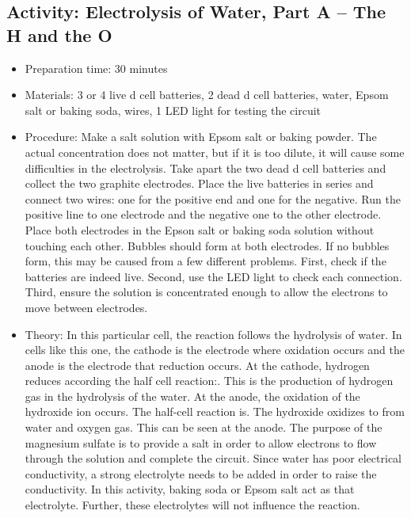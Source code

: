 \begin{itemize}
{\begin{itemize}
\subsection{Activity: Electrolysis of Water, Part A – The H and the O}
\begin{itemize}
\item{Preparation time: 30 minutes}
\item{Materials: 3 or 4 live d cell batteries, 2 dead d cell batteries, water, Epsom salt or baking soda, wires, 1 LED light for testing the circuit}
\item{Procedure: Make a salt solution with Epsom salt or baking powder. The actual concentration does not matter, but if it is too dilute, it will cause some difficulties in the electrolysis. Take apart the two dead d cell batteries and collect the two graphite electrodes. Place the live batteries in series and connect two wires: one for the positive end and one for the negative. Run the positive line to one electrode and the negative one to the other electrode. Place both electrodes in the Epson salt or baking soda solution without touching each other. Bubbles should form at both electrodes. If no bubbles form, this may be caused from a few different problems. First, check if the batteries are indeed live. Second, use the LED light to check each connection. Third, ensure the solution is concentrated enough to allow the electrons to move between electrodes. }
\item{Theory: In this particular cell, the reaction follows the hydrolysis of water. In cells like this one, the cathode is the electrode where oxidation occurs and the anode is the electrode that reduction occurs. At the cathode, hydrogen reduces according the half cell reaction:. This is the production of hydrogen gas in the hydrolysis of the water. At the anode, the oxidation of the hydroxide ion occurs. The half-cell reaction is. The hydroxide oxidizes to from water and oxygen gas. This can be seen at the anode. The purpose of the magnesium sulfate is to provide a salt in order to allow electrons to flow through the solution and complete the circuit. Since water has poor electrical conductivity, a strong electrolyte needs to be added in order to raise the conductivity. In this activity, baking soda or Epsom salt act as that electrolyte. Further, these electrolytes will not influence the reaction.}
\end{itemize}


\end{itemize}}
\end{itemize}
